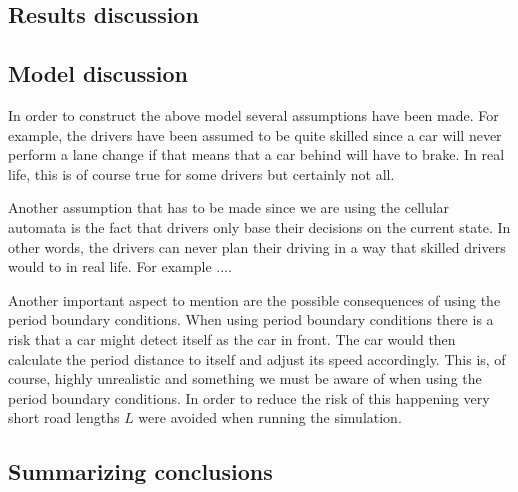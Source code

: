 \documentclass[a4paper,12pt]{article}
\begin{document}
\subsection*{Results discussion}

\subsection*{Model discussion}
In order to construct the above model several assumptions have been made. For example, the drivers have been assumed to be quite skilled
since a car will never perform a lane change if that means that a car behind will have to brake. In real life, this is of course true for some drivers 
but certainly not all.

Another assumption that has to be made since we are using the cellular automata is the fact that drivers only base their decisions on the current state. In other words, 
the drivers can never plan their driving in a way that skilled drivers would to in real life. For example ....

Another important aspect to mention are the possible consequences of using the period boundary conditions. When using period boundary conditions there is a risk
that a car might detect itself as the car in front. The car would then calculate the period distance to itself and adjust its speed accordingly. 
This is, of course, highly unrealistic and something we must be aware of when using the period boundary conditions. In order to reduce the risk of this happening
very short road lengths $L$ were avoided when running the simulation.

\subsection*{Summarizing conclusions}
\end{document}
